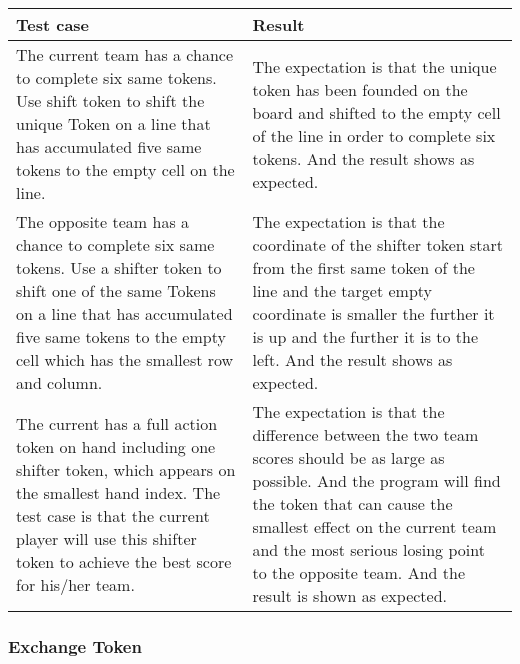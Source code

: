 \begin{table}[h]
	\centering
	\begin{tabular}{p{7cm}@{\hskip 5mm}  p{7cm}} 
		\toprule
		Test case   & Result   \\ 
		\midrule
		\midrule
	     The current team has a chance to complete six same tokens. Use shift token to shift the unique Token on a line that has accumulated five same tokens to the empty cell on the line.  & The expectation is that the unique token has been founded on the board and shifted to the empty cell of the line in order to complete six tokens. And the result shows as expected. \\
		\midrule
		The opposite team has a chance to complete six same tokens. Use a shifter token to shift one of the same Tokens on a line that has accumulated five same tokens to the empty cell which has the smallest row and column. & The expectation is that the coordinate of the shifter token start from the first same token of the line and the target empty coordinate is smaller the further it is up and the further it is to the left. And the result shows as expected.  \\
		\midrule
		The current has a full action token on hand including one shifter token, which appears on the smallest hand index. The test case is that the current player will use this shifter token to achieve the best score for his/her team. & The expectation is that the difference between the two team scores should be as large as possible. And the program will find the token that can cause the smallest effect on the current team and the most serious losing point to the opposite team. And the result is shown as expected. \\
		\bottomrule
	\end{tabular}
\end{table}

\newpage
\subsubsection{Exchange Token}


